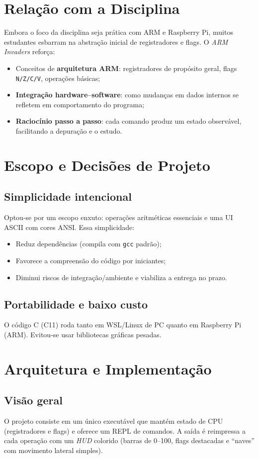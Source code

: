 \documentclass[12pt,a4paper]{article}
\begin{document}
\section{Relação com a Disciplina}
Embora o foco da disciplina seja prática com ARM e Raspberry Pi, muitos estudantes esbarram na abstração inicial de registradores e flags. O \textit{ARM Invaders} reforça:
\begin{itemize}[noitemsep]
  \item Conceitos de \textbf{arquitetura ARM}: registradores de propósito geral, flags \texttt{N/Z/C/V}, operações básicas;
  \item \textbf{Integração hardware--software}: como mudanças em dados internos se refletem em comportamento do programa;
  \item \textbf{Raciocínio passo a passo}: cada comando produz um estado observável, facilitando a depuração e o estudo.
\end{itemize}

\section{Escopo e Decisões de Projeto}
\subsection{Simplicidade intencional}
Optou-se por um escopo enxuto: operações aritméticas essenciais e uma UI ASCII com cores ANSI. Essa simplicidade:
\begin{itemize}[noitemsep]
  \item Reduz dependências (compila com \texttt{gcc} padrão);
  \item Favorece a compreensão do código por iniciantes;
  \item Diminui riscos de integração/ambiente e viabiliza a entrega no prazo.
\end{itemize}

\subsection{Portabilidade e baixo custo}
O código C (C11) roda tanto em WSL/Linux de PC quanto em Raspberry Pi (ARM). Evitou-se usar bibliotecas gráficas pesadas.

\section{Arquitetura e Implementação}
\subsection{Visão geral}
O projeto consiste em um único executável que mantém estado de CPU (registradores e flags) e oferece um REPL de comandos. A saída é reimpressa a cada operação com um \textit{HUD} colorido (barras de 0--100, flags destacadas e ``naves'' com movimento lateral simples).
\end{document}
